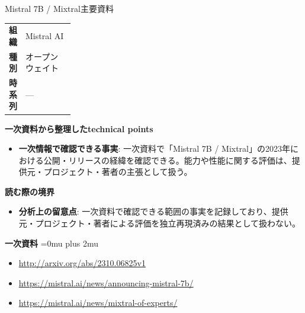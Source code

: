 \begin{technicalnote}{Mistral 7B / Mixtral}{主要資料}
\begingroup
\begin{tabularx}{\linewidth}{@{}>{\bfseries}p{0.22\linewidth}X@{}}
組織 & Mistral AI \\
種別 & オープンウェイト \\
時系列 & — \\
\end{tabularx}
\smallskip
{\bfseries 一次資料から整理したtechnical points}
\begin{itemize}[leftmargin=1.5em,itemsep=0.35em]
\item \textbf{一次情報で確認できる事実}: 一次資料で「Mistral 7B / Mixtral」の2023年における公開・リリースの経緯を確認できる。能力や性能に関する評価は、提供元・プロジェクト・著者の主張として扱う。
\end{itemize}
\begin{minipage}{\linewidth}
{\bfseries 読む際の境界}
\begin{itemize}[leftmargin=1.5em,itemsep=0.35em]
\item \textbf{分析上の留意点}: 一次資料で確認できる範囲の事実を記録しており、提供元・プロジェクト・著者による評価を独立再現済みの結果として扱わない。
\end{itemize}
\begin{samepage}
{\bfseries 一次資料}
\begingroup\sloppy
\Urlmuskip=0mu plus 2mu\relax
\begin{itemize}[leftmargin=1.5em,itemsep=0.25em]
\item {\scriptsize\url{http://arxiv.org/abs/2310.06825v1}}
\item {\scriptsize\url{https://mistral.ai/news/announcing-mistral-7b/}}
\item {\scriptsize\url{https://mistral.ai/news/mixtral-of-experts/}}
\end{itemize}
\endgroup
\end{samepage}
\end{minipage}
\endgroup
\end{technicalnote}
\medskip

